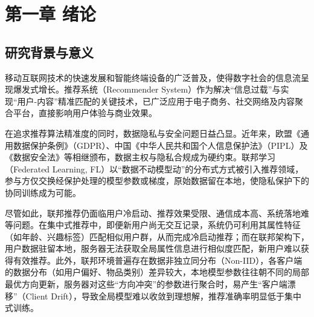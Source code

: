 \newpage
{}\setcounter{page}{1}
\pagestyle{fancy}
\section{第一章\texorpdfstring{\quad}{} 绪论}
\label{chap:intro}
\setcounter{section}{1} \setcounter{subsection}{0}


\subsection{研究背景与意义}

移动互联网技术的快速发展和智能终端设备的广泛普及，使得数字社会的信息流呈现爆发式增长。推荐系统（Recommender System）作为解决“信息过载”与实现“用户-内容”精准匹配的关键技术，已广泛应用于电子商务、社交网络及内容聚合平台，直接影响用户体验与商业效果。

在追求推荐算法精准度的同时，数据隐私与安全问题日益凸显。近年来，欧盟《通用数据保护条例》（GDPR）\cite{gdpr2016}、中国《中华人民共和国个人信息保护法》（PIPL）\cite{pipl2021}及《数据安全法》等相继颁布，数据主权与隐私合规成为硬约束。联邦学习（Federated Learning, FL）\cite{wu2021fedgnn}以“数据不动模型动”的分布式方式被引入推荐领域，参与方仅交换经保护处理的模型参数或梯度，原始数据留在本地，使隐私保护下的协同训练成为可能。

尽管如此，联邦推荐仍面临用户冷启动、推荐效果受限、通信成本高、系统落地难等问题\cite{ye2023heterogeneous, zhang2024ifedrec}。在集中式推荐中，即便新用户尚无交互记录，系统仍可利用其属性特征（如年龄、兴趣标签）匹配相似用户群，从而完成冷启动推荐\cite{qiao2018coldstart}；而在联邦架构下，用户数据驻留本地，服务器无法获取全局属性信息进行相似度匹配\cite{zhang2024ifedrec}，新用户难以获得有效推荐。此外，联邦环境普遍存在数据非独立同分布（Non-IID）\cite{ye2023heterogeneous}，各客户端的数据分布（如用户偏好、物品类别）差异较大，本地模型参数往往朝不同的局部最优方向更新，服务器对这些“方向冲突”的参数进行聚合时，易产生“客户端漂移”（Client Drift）\cite{tan2023fedstar}，导致全局模型难以收敛到理想解，推荐准确率明显低于集中式训练。

